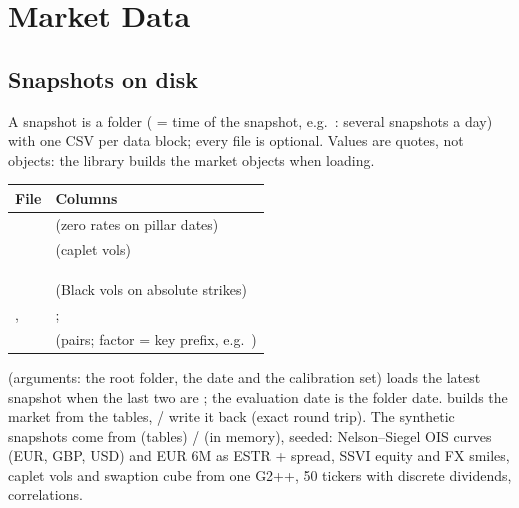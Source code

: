 \section{Market Data}\label{sec:arch-market-data}

\subsection{Snapshots on disk}\label{sec:arch-snapshots}
A snapshot is a folder  ( = time of the
snapshot, e.g.\ : several snapshots a day) with one CSV per data block; every file is optional.
Values are quotes, not objects: the library builds the market objects when loading.

\begin{center}
\small
\begin{tabular}{@{}L{3.6cm}L{11.6cm}@{}}
\toprule
File & Columns \\
\midrule
{} &  (zero rates on pillar dates) \\
 &  (caplet vols) \\
 &  \\
 &  \\
 &  \\
 &  (Black vols on absolute strikes) \\
,  & ;  \\
 &  (pairs; factor = key prefix, e.g.\ ) \\
\bottomrule
\end{tabular}
\end{center}

 (arguments: the root folder, the date and the calibration set) loads
the latest snapshot when the last two are ; the evaluation date is the folder date.  builds the market
from the tables,  /  write it back (exact round trip). The synthetic snapshots
come from  (tables) /  (in memory), seeded:
Nelson--Siegel OIS curves (EUR, GBP, USD) and EUR 6M as ESTR + spread, SSVI equity and FX smiles, caplet vols and
swaption cube from one G2++, 50 tickers with discrete dividends, correlations.
